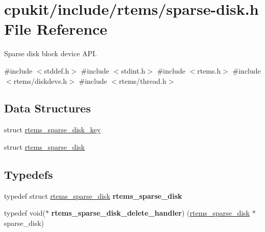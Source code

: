 \hypertarget{sparse-disk_8h}{}\section{cpukit/include/rtems/sparse-\/disk.h File Reference}
\label{sparse-disk_8h}


Sparse disk block device A\+PI.  


{\ttfamily \#include $<$stddef.\+h$>$}\newline
{\ttfamily \#include $<$stdint.\+h$>$}\newline
{\ttfamily \#include $<$rtems.\+h$>$}\newline
{\ttfamily \#include $<$rtems/diskdevs.\+h$>$}\newline
{\ttfamily \#include $<$rtems/thread.\+h$>$}\newline
\subsection*{Data Structures}
\begin{DoxyCompactItemize}
\item 
struct \mbox{\hyperlink{structrtems__sparse__disk__key}{rtems\+\_\+sparse\+\_\+disk\+\_\+key}}
\item 
struct \mbox{\hyperlink{structrtems__sparse__disk}{rtems\+\_\+sparse\+\_\+disk}}
\end{DoxyCompactItemize}
\subsection*{Typedefs}
\begin{DoxyCompactItemize}
\item 
typedef struct \mbox{\hyperlink{structrtems__sparse__disk}{rtems\+\_\+sparse\+\_\+disk}} {\bfseries rtems\+\_\+sparse\+\_\+disk}
\item 
typedef void($\ast$ {\bfseries rtems\+\_\+sparse\+\_\+disk\+\_\+delete\+\_\+handler}) (\mbox{\hyperlink{structrtems__sparse__disk}{rtems\+\_\+sparse\+\_\+disk}} $\ast$sparse\+\_\+disk)
\end{DoxyCompactItemize}
